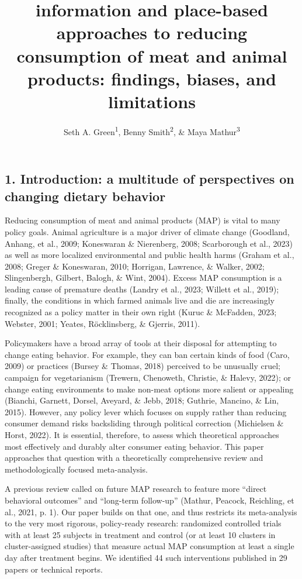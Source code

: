 \documentclass[
  man]{apa6}
\title{information and place-based approaches to reducing consumption of meat and animal products: findings, biases, and limitations}
\author{Seth A. Green\textsuperscript{1}, Benny Smith\textsuperscript{2}, \& Maya Mathur\textsuperscript{3}}
\date{}
\affiliation{\vspace{0.5cm}\textsuperscript{1} Kahneman-Treisman Center, Princeton University\\\textsuperscript{2} Allied Scholars for Animal Protection\\\textsuperscript{3} Stanford University}
\begin{document}
\maketitle

\subsection{1. Introduction: a multitude of perspectives on changing dietary behavior}\label{introduction-a-multitude-of-perspectives-on-changing-dietary-behavior}

Reducing consumption of meat and animal products (MAP) is vital to many policy goals. Animal agriculture is a major driver of climate change (Goodland, Anhang, et al., 2009; Koneswaran \& Nierenberg, 2008; Scarborough et al., 2023) as well as more localized environmental and public health harms (Graham et al., 2008; Greger \& Koneswaran, 2010; Horrigan, Lawrence, \& Walker, 2002; Slingenbergh, Gilbert, Balogh, \& Wint, 2004). Excess MAP consumption is a leading cause of premature deaths (Landry et al., 2023; Willett et al., 2019); finally, the conditions in which farmed animals live and die are increasingly recognized as a policy matter in their own right (Kuruc \& McFadden, 2023; Webster, 2001; Yeates, Röcklinsberg, \& Gjerris, 2011).

Policymakers have a broad array of tools at their disposal for attempting to change eating behavior. For example, they can ban certain kinds of food (Caro, 2009) or practices (Bursey \& Thomas, 2018) perceived to be unusually cruel; campaign for vegetarianism (Trewern, Chenoweth, Christie, \& Halevy, 2022); or change eating environments to make non-meat options more salient or appealing (Bianchi, Garnett, Dorsel, Aveyard, \& Jebb, 2018; Guthrie, Mancino, \& Lin, 2015). However, any policy lever which focuses on supply rather than reducing consumer demand risks backsliding through political correction (Michielsen \& Horst, 2022). It is essential, therefore, to assess which theoretical approaches most effectively and durably alter consumer eating behavior. This paper approaches that question with a theoretically comprehensive review and methodologically focused meta-analysis.

A previous review called on future MAP research to feature more ``direct behavioral outcomes'' and ``long-term follow-up'' (Mathur, Peacock, Reichling, et al., 2021, p. 1). Our paper builds on that one, and thus restricts its meta-analysis to the very most rigorous, policy-ready research: randomized controlled trials with at least 25 subjects in treatment and control (or at least 10 clusters in cluster-assigned studies) that measure actual MAP consumption at least a single day after treatment begins. We identified 44 such interventions published in 29 papers or technical reports.
\end{document}
